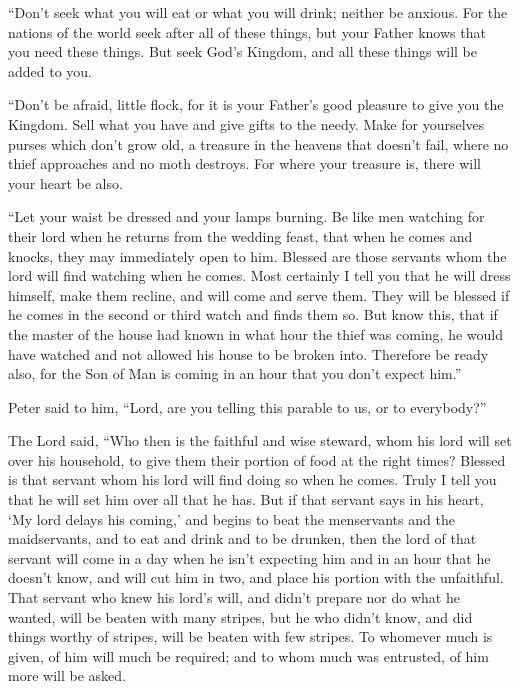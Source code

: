 ``Don't seek what you will eat or what you will drink;
neither be anxious.  For the nations of the world seek
after all of these things, but your Father knows that you need these
things.  But seek God's Kingdom, and all these things
will be added to you.

 ``Don't be afraid, little flock, for it is your Father's
good pleasure to give you the Kingdom.  Sell what you
have and give gifts to the needy. Make for yourselves purses which don't
grow old, a treasure in the heavens that doesn't fail, where no thief
approaches and no moth destroys.  For where your treasure
is, there will your heart be also.

 ``Let your waist be dressed and your lamps burning.
 Be like men watching for their lord when he returns from
the wedding feast, that when he comes and knocks, they may immediately
open to him.  Blessed are those servants whom the lord
will find watching when he comes. Most certainly I tell you that he will
dress himself, make them recline, and will come and serve them.
 They will be blessed if he comes in the second or third
watch and finds them so.  But know this, that if the
master of the house had known in what hour the thief was coming, he
would have watched and not allowed his house to be broken into.
 Therefore be ready also, for the Son of Man is coming in
an hour that you don't expect him.''

 Peter said to him, ``Lord, are you telling this parable
to us, or to everybody?''

 The Lord said, ``Who then is the faithful and wise
steward, whom his lord will set over his household, to give them their
portion of food at the right times?  Blessed is that
servant whom his lord will find doing so when he comes. 
Truly I tell you that he will set him over all that he has.
 But if that servant says in his heart, `My lord delays
his coming,' and begins to beat the menservants and the maidservants,
and to eat and drink and to be drunken,  then the lord of
that servant will come in a day when he isn't expecting him and in an
hour that he doesn't know, and will cut him in two, and place his
portion with the unfaithful.  That servant who knew his
lord's will, and didn't prepare nor do what he wanted, will be beaten
with many stripes,  but he who didn't know, and did
things worthy of stripes, will be beaten with few stripes. To whomever
much is given, of him will much be required; and to whom much was
entrusted, of him more will be asked.

